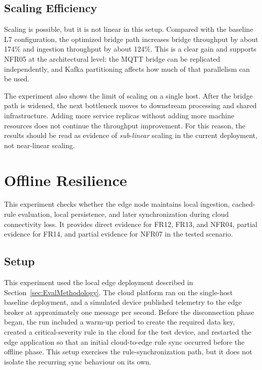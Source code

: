 \subsection{Scaling Efficiency}
\label{subsec:EvalScalingEfficiency}

Scaling is possible, but it is not linear in this setup. Compared with the baseline L7 configuration, the optimized bridge path increases bridge throughput by about 174\% and ingestion throughput by about 124\%. This is a clear gain and supports NFR05 at the architectural level: the \gls{MQTT} bridge can be replicated independently, and Kafka partitioning affects how much of that parallelism can be used.

The experiment also shows the limit of scaling on a single host. After the bridge path is widened, the next bottleneck moves to downstream processing and shared infrastructure. Adding more service replicas without adding more machine resources does not continue the throughput improvement. For this reason, the results should be read as evidence of \emph{sub-linear} scaling in the current deployment, not near-linear scaling.


\section{Offline Resilience}
\label{sec:EvalOffline}

This experiment checks whether the edge node maintains local ingestion, cached-rule evaluation, local persistence, and later synchronization during cloud connectivity loss. It provides direct evidence for FR12, FR13, and NFR04, partial evidence for FR14, and partial evidence for NFR07 in the tested scenario.

\subsection{Setup}
\label{subsec:EvalOfflineSetup}

This experiment used the local edge deployment described in Section~\ref{sec:EvalMethodology}. The cloud platform ran on the single-host baseline deployment, and a simulated device published telemetry to the edge broker at approximately one message per second. Before the disconnection phase began, the run included a warm-up period to create the required data key, created a critical-severity rule in the cloud for the test device, and restarted the edge application so that an initial cloud-to-edge rule sync occurred before the offline phase. This setup exercises the rule-synchronization path, but it does not isolate the recurring sync behaviour on its own.

